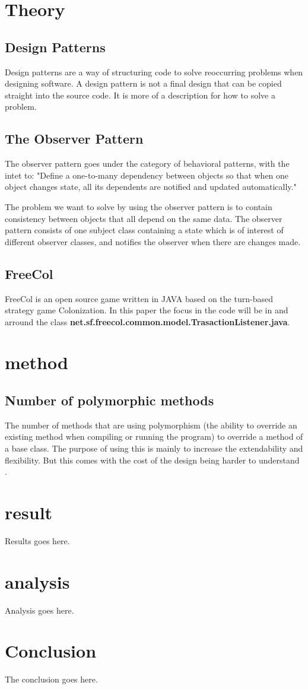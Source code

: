 \documentclass[journal]{IEEEtran}
\begin{document}
\section{Theory}
\subsection{Design Patterns}
Design patterns are a way of structuring code to solve reoccurring problems when designing software. A design pattern is not a final design that can be copied straight into the source code. It is more of a description for how to solve a problem. \cite{Usefulnessofdesign}
 
\subsection{The Observer Pattern}
The observer pattern goes under the category of behavioral patterns, with the intet to: "Define a one-to-many dependency between objects so that when one object changes state, all its dependents are notified and updated automatically." \cite{gof}

The problem we want to solve by using the observer pattern is to contain consistency between objects that all depend on the same data. The observer pattern consists of one subject class containing a state which is of interest of different observer classes, and notifies the observer when there are changes made.

\subsection{FreeCol}
FreeCol is an open source game written in JAVA based on the turn-based strategy game Colonization\cite{freecol}. In this paper the focus in the code will be in and arround the class \textbf{net.sf.freecol.common.model.TrasactionListener.java}.

\section{method}
\subsection{Number of polymorphic methods}
The number of  methods that are using polymorphism (the ability to override an existing method when compiling or running the program)  to override a method of a base class. The purpose of using this is mainly to increase the extendability and flexibility. But this comes with the cost of the design being harder to understand \cite{qualityassessment}.
\section{result}
Results goes here.
\section{analysis}
Analysis goes here.
\section{Conclusion}
The conclusion goes here.
\newpage



\end{document}
